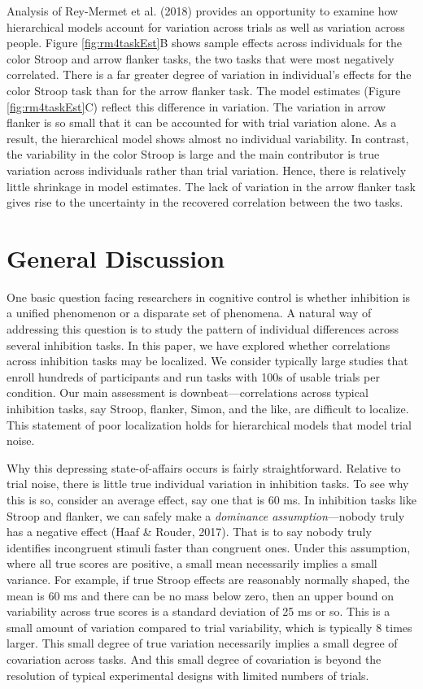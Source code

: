 \documentclass[
  ,man]{apa6}
\begin{document}
Analysis of Rey-Mermet et al. (2018) provides an opportunity to examine how hierarchical models account for variation across trials as well as variation across people. Figure \ref{fig:rm4taskEst}B shows sample effects across individuals for the color Stroop and arrow flanker tasks, the two tasks that were most negatively correlated. There is a far greater degree of variation in individual's effects for the color Stroop task than for the arrow flanker task. The model estimates (Figure \ref{fig:rm4taskEst}C) reflect this difference in variation. The variation in arrow flanker is so small that it can be accounted for with trial variation alone. As a result, the hierarchical model shows almost no individual variability. In contrast, the variability in the color Stroop is large and the main contributor is true variation across individuals rather than trial variation. Hence, there is relatively little shrinkage in model estimates. The lack of variation in the arrow flanker task gives rise to the uncertainty in the recovered correlation between the two tasks.

\hypertarget{general-discussion}{%
\section{General Discussion}\label{general-discussion}}

One basic question facing researchers in cognitive control is whether inhibition is a unified phenomenon or a disparate set of phenomena. A natural way of addressing this question is to study the pattern of individual differences across several inhibition tasks. In this paper, we have explored whether correlations across inhibition tasks may be localized. We consider typically large studies that enroll hundreds of participants and run tasks with 100s of usable trials per condition. Our main assessment is downbeat---correlations across typical inhibition tasks, say Stroop, flanker, Simon, and the like, are difficult to localize. This statement of poor localization holds for hierarchical models that model trial noise.

Why this depressing state-of-affairs occurs is fairly straightforward. Relative to trial noise, there is little true individual variation in inhibition tasks. To see why this is so, consider an average effect, say one that is 60 ms. In inhibition tasks like Stroop and flanker, we can safely make a \emph{dominance assumption}---nobody truly has a negative effect (Haaf \& Rouder, 2017). That is to say nobody truly identifies incongruent stimuli faster than congruent ones. Under this assumption, where all true scores are positive, a small mean necessarily implies a small variance. For example, if true Stroop effects are reasonably normally shaped, the mean is 60 ms and there can be no mass below zero, then an upper bound on variability across true scores is a standard deviation of 25 ms or so. This is a small amount of variation compared to trial variability, which is typically 8 times larger. This small degree of true variation necessarily implies a small degree of covariation across tasks. And this small degree of covariation is beyond the resolution of typical experimental designs with limited numbers of trials.
\end{document}
